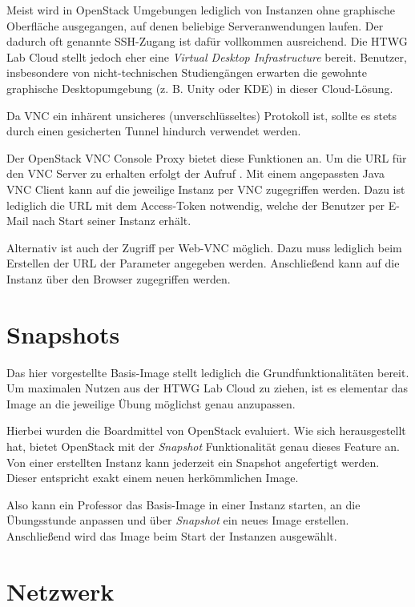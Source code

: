 Meist wird in OpenStack Umgebungen lediglich von Instanzen ohne graphische Oberfläche ausgegangen, auf denen beliebige Serveranwendungen laufen. 
Der dadurch oft genannte SSH-Zugang ist dafür vollkommen ausreichend.
Die HTWG Lab Cloud stellt jedoch eher eine \emph{Virtual Desktop Infrastructure} bereit.
Benutzer, insbesondere von nicht-technischen Studiengängen erwarten die gewohnte graphische Desktopumgebung (z. B. Unity oder KDE) in dieser Cloud-Lösung.

Da VNC ein inhärent unsicheres (unverschlüsseltes) Protokoll ist, sollte es stets durch einen gesicherten Tunnel hindurch verwendet werden.

Der OpenStack VNC Console Proxy bietet diese Funktionen an.
Um die URL für den VNC Server zu erhalten erfolgt der Aufruf .
Mit einem angepassten Java VNC Client \cite{vncJava} kann auf die jeweilige Instanz per VNC zugegriffen werden. 
Dazu ist lediglich die URL mit dem Access-Token notwendig, welche der Benutzer per E-Mail nach Start seiner Instanz erhält.

Alternativ ist auch der Zugriff per Web-VNC möglich. 
Dazu muss lediglich beim Erstellen der URL der Parameter  angegeben werden. 
Anschließend kann auf die Instanz über den Browser zugegriffen werden.

\section{Snapshots}

Das hier vorgestellte Basis-Image stellt lediglich die Grundfunktionalitäten bereit. 
Um maximalen Nutzen aus der HTWG Lab Cloud zu ziehen, ist es elementar das Image an die jeweilige Übung möglichst genau anzupassen.

Hierbei wurden die Boardmittel von OpenStack evaluiert.
Wie sich herausgestellt hat, bietet OpenStack mit der \emph{Snapshot} Funktionalität genau dieses Feature an.
Von einer erstellten Instanz kann jederzeit ein Snapshot angefertigt werden.
Dieser entspricht exakt einem neuen herkömmlichen Image.

Also kann ein Professor das Basis-Image in einer Instanz starten, an die Übungsstunde anpassen und über \emph{Snapshot} ein neues Image erstellen.
Anschließend wird das Image beim Start der Instanzen ausgewählt.

\section{Netzwerk}

